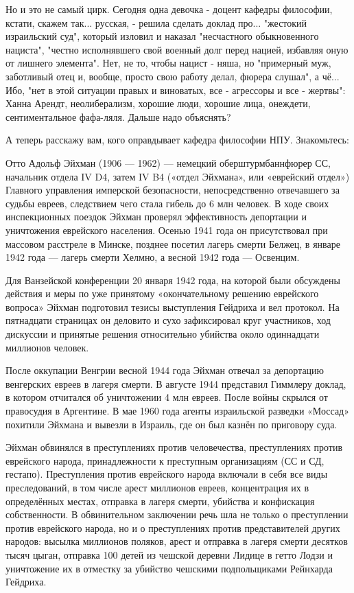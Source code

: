 Но и это не самый цирк. Сегодня одна девочка - доцент кафедры философии,
кстати, скажем так... русская, - решила сделать доклад про... "жестокий
израильский суд", который изловил и наказал "несчастного обыкновенного
нациста", "честно исполнявшего свой военный долг перед нацией, избавляя оную от
лишнего элемента". Нет, не то, чтобы нацист - няша, но "примерный муж,
заботливый отец и, вообще, просто свою работу делал, фюрера слушал", а чё...
Ибо, "нет в этой ситуации правых и виноватых, все - агрессоры и все - жертвы":
Ханна Арендт, неолиберализм, хорошие люди, хорошие лица, онеждети,
сентиментальное фафа-ляля. Дальше надо объяснять?

А теперь расскажу вам, кого оправдывает кафедра философии НПУ. Знакомьтесь: 

Отто Адольф Эйхман (1906 — 1962) — немецкий оберштурмбаннфюрер СС, начальник
отдела IV D4, затем IV B4 («отдел Эйхмана», или «еврейский отдел») Главного
управления имперской безопасности, непосредственно отвечавшего за судьбы
евреев, следствием чего стала гибель до 6 млн человек. В ходе своих
инспекционных поездок Эйхман проверял эффективность депортации и уничтожения
еврейского населения. Осенью 1941 года он присутствовал при массовом расстреле
в Минске, позднее посетил лагерь смерти Белжец, в январе 1942 года — лагерь
смерти Хелмно, а весной 1942 года — Освенцим.

Для Ванзейской конференции 20 января 1942 года, на которой были обсуждены
действия и меры по уже принятому «окончательному решению еврейского вопроса»
Эйхман подготовил тезисы выступления Гейдриха и вел протокол. На пятнадцати
страницах он деловито и сухо зафиксировал круг участников, ход дискуссии и
принятые решения относительно убийства около одиннадцати миллионов человек.

После оккупации Венгрии весной 1944 года Эйхман отвечал за депортацию
венгерских евреев в лагеря смерти. В августе 1944 представил Гиммлеру доклад, в
котором отчитался об уничтожении 4 млн евреев. После войны скрылся от
правосудия в Аргентине. В мае 1960 года агенты израильской разведки «Моссад»
похитили Эйхмана и вывезли в Израиль, где он был казнён по приговору суда.

Эйхман обвинялся в преступлениях против человечества, преступлениях против
еврейского народа, принадлежности к преступным организациям (СС и СД, гестапо).
Преступления против еврейского народа включали в себя все виды преследований, в
том числе арест миллионов евреев, концентрация их в определённых местах,
отправка в лагеря смерти, убийства и конфискация собственности. В обвинительном
заключении речь шла не только о преступлении против еврейского народа, но и о
преступлениях против представителей других народов: высылка миллионов поляков,
арест и отправка в лагеря смерти десятков тысяч цыган, отправка 100 детей из
чешской деревни Лидице в гетто Лодзи и уничтожение их в отместку за убийство
чешскими подпольщиками Рейнхарда Гейдриха.

